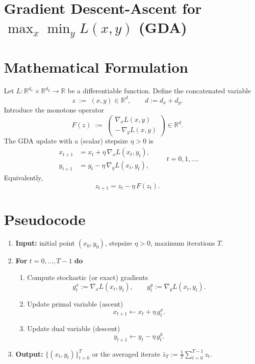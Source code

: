 \documentclass{article}
\begin{document}
\section*{Gradient Descent-Ascent for \(\max_{x}\min_{y} L(x,y)\) (GDA)}

\section*{Mathematical Formulation}
Let \(L:\mathbb{R}^{d_x}\times\mathbb{R}^{d_y}\rightarrow\mathbb{R}\) be a differentiable function.  
Define the concatenated variable 
\[
z\;:=\;(x,y)\in\mathbb{R}^{d},\qquad d:=d_x+d_y .
\]
Introduce the monotone operator
\[
F(z)\;:=\;\begin{pmatrix}
\displaystyle \nabla_x L(x,y)\\[4pt]
\displaystyle -\,\nabla_y L(x,y)
\end{pmatrix}\in\mathbb{R}^{d}.
\]
The GDA update with a (scalar) stepsize \(\eta>0\) is
\[
\boxed{
\begin{aligned}
x_{t+1} &= x_t + \eta\,\nabla_x L(x_t,y_t),\\[4pt]
y_{t+1} &= y_t - \eta\,\nabla_y L(x_t,y_t),
\end{aligned}}
\qquad t=0,1,\dots .
\]
Equivalently,
\[
z_{t+1}=z_t-\eta\,F(z_t).
\]

\section*{Pseudocode}
\begin{enumerate}[leftmargin=*, label=\textbf{Step \arabic*:}]
\item \textbf{Input:} initial point \((x_0,y_0)\), stepsize \(\eta>0\), maximum iterations \(T\).
\item \textbf{For} \(t=0,\dots,T-1\) \textbf{do}
\begin{enumerate}[label=\roman*.]
\item Compute stochastic (or exact) gradients 
\[
g_t^x:=\nabla_x L(x_t,y_t),\qquad g_t^y:=\nabla_y L(x_t,y_t).
\]
\item Update primal variable (ascent)
\[
x_{t+1}\gets x_t+\eta\,g_t^x .
\]
\item Update dual variable (descent)
\[
y_{t+1}\gets y_t-\eta\,g_t^y .
\]
\end{enumerate}
\item \textbf{Output:} \(\{(x_t,y_t)\}_{t=0}^{T}\) or the averaged iterate 
\(\bar z_T:=\frac1T\sum_{t=0}^{T-1}z_t\).
\end{enumerate}
\end{document}
